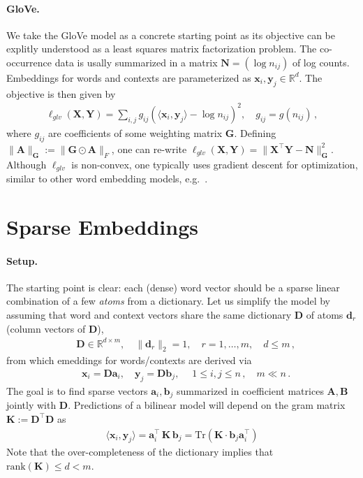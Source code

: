 \documentclass{article}
\renewcommand{\Re}{{\mathbb R}}
\newcommand{\x}{{\mathbf x}}
\newcommand{\valpha}{{\boldsymbol a}}
\newcommand{\vbeta}{{\boldsymbol b}}
\newcommand{\y}{{\mathbf y}}
\newcommand{\mN}{{\mathbf N}}
\newcommand{\mG}{{\mathbf G}}
\newcommand{\mK}{{\mathbf K}}
\newcommand{\mD}{{\mathbf D}}
\newcommand{\mA}{{\mathbf A}}
\newcommand{\mB}{{\mathbf B}}
\newcommand{\mX}{{\mathbf X}}
\newcommand{\mY}{{\mathbf Y}}
\begin{document}
\paragraph{GloVe.} We take the GloVe model \cite{pennington2014glove} as a concrete starting point as its objective can be explitly understood as a least squares matrix factorization problem. The co-occurrence data is usally summarized in a matrix $\mN = (\log n_{ij})$ of log counts. Embeddings for words and contexts are parameterized as $\x_i, \y_j \in \Re^d$. The objective is then given by
\begin{align}
\ell_{glv}(\mX,\mY) = \sum_{i,j}  g_{ij} ( \langle \x_i, \y_j \rangle - \log n_{ij})^2, \quad g_{ij} = g(n_{ij})\,,
\end{align}
where $g_{ij}$ are coefficients of some weighting matrix $\mathbf G$. Defining $\| \mA\|_\mG := \| \mG \odot \mA \|_F$, one can re-write $\ell_{glv}(\mX,\mY) = \| \mX^\top \mY - \mN\|_\mG^2$.  Although $\ell_{glv}$ is non-convex, one typically uses  gradient descent for optimization, similar to other word embedding models, e.g.~\cite{mikolov2013distributed}. 


\section{Sparse Embeddings}

\paragraph{Setup.} 
The starting point is clear: each (dense) word vector should be a sparse linear combination of a few \textit{atoms} from a dictionary. Let us simplify the model  by assuming that word and context vectors  share the same dictionary $\mD$ of atoms $\mathbf d_r$ (column vectors of $\mD$),
\begin{align}
& \mD \in \Re^{d \times m}, \quad \| \mathbf d_{r}\|_2 =1, \quad r=1,\dots,m, \quad d \le m\,,
\end{align}
from which emeddings for words/contexts are derived via
\begin{align}
& \x_i = \mD \valpha_i, \quad  \y_j = \mD \vbeta_j, \quad  \; 1 \le i,j  \le n\,, \quad m \ll n\,.
\end{align}
The  goal is to find sparse vectors $\valpha_i, \vbeta_j$ summarized in coefficient matrices $\mA, \mB$ jointly with $\mD$.  Predictions of a bilinear model will depend on the gram matrix $\mK := \mD^\top \mD$ as
\begin{align}
\langle \x_i, \y_j \rangle = \valpha_i^\top \, \mK \, \vbeta_j = \text{Tr}\left( \mK \cdot \vbeta_j \valpha_i^\top\right)
\label{eq:sparse-model}
\end{align}
Note that the over-completeness of the dictionary implies that $\text{rank}(\mK) \le d < m$.
\end{document}
